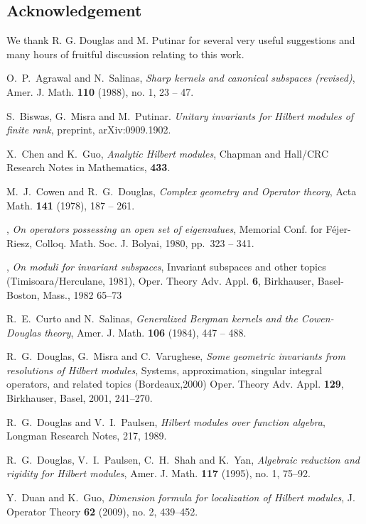 \documentclass[11pt]{amsart}
\theoremstyle{definition}
\numberwithin{equation}{section}
\begin{document}
\subsection*{\sf Acknowledgement} We thank R. G. Douglas and M. Putinar for several very useful suggestions and many hours of fruitful discussion relating to this work.

\begin{thebibliography}{99}

O.~P.~Agrawal and N.~Salinas, {\em Sharp kernels and canonical
subspaces (revised)}, Amer. J. Math. \textbf{110} (1988), no. 1,
23 -- 47.

S.~Biswas, G.~Misra and M.~Putinar. \emph{Unitary invariants for Hilbert modules of finite rank}, preprint, arXiv:0909.1902.

X.~Chen and K.~Guo, \emph{Analytic Hilbert modules}, Chapman and
Hall/CRC Research Notes in Mathematics, \textbf{433}.

M.~J.~Cowen and R.~G.~Douglas, {\em Complex geometry and
Operator theory}, Acta Math. \textbf{141} (1978), 187 -- 261.

\bysame, \emph{On operators possessing an open set of eigenvalues},
Memorial
Conf. for F\'{e}jer-Riesz, Colloq. Math. Soc. J. Bolyai, 1980, pp.~323 --
341.

\bysame, \emph{On moduli for invariant subspaces},  Invariant subspaces and other topics (Timisoara/Herculane, 1981), Oper. Theory Adv. Appl. \textbf{6}, Birkhauser, Basel-Boston, Mass., 1982 65--73

R.~E.~Curto and N.~Salinas, {\em Generalized Bergman kernels and
the Cowen-Douglas theory}, Amer. J. Math. \textbf{106} (1984), 447
-- 488.

R.~G.~Douglas, G.~Misra and C.~Varughese, {\em Some geometric
invariants from resolutions of Hilbert modules}, Systems,
approximation, singular integral operators, and related topics
(Bordeaux,2000) Oper. Theory Adv. Appl. \textbf{129}, Birkhauser,
Basel, 2001, 241--270.

R.~G.~Douglas and V.~I.~Paulsen, {\em Hilbert modules over function
algebra}, Longman Research Notes, 217, 1989.

R.~G.~Douglas, V.~I.~Paulsen, C.~H.~Shah and K.~Yan, {\em Algebraic reduction and rigidity for Hilbert modules}, Amer. J. Math. \textbf{117} (1995), no. 1,
75--92.

Y.~Duan and K.~Guo, \emph{Dimension formula for localization of
Hilbert modules},  J. Operator Theory \textbf{62} (2009),  no. 2, 439--452.


\end{thebibliography}
\end{document}
